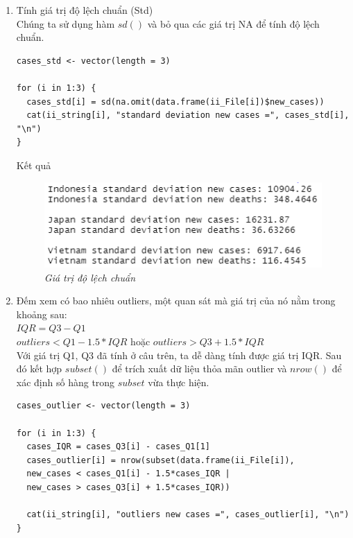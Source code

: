 \documentclass[a4paper]{article}
\theoremstyle{definition}
\begin{document}
\begin{enumerate}[1)]
    
\item Tính giá trị độ lệch chuẩn (Std)\\
    Chúng ta sử dụng hàm $sd()$ và bỏ qua các giá trị NA để tính độ lệch chuẩn.
    
    \begin{lstlisting}
cases_std <- vector(length = 3)

for (i in 1:3) {
  cases_std[i] = sd(na.omit(data.frame(ii_File[i])$new_cases))
  cat(ii_string[i], "standard deviation new cases =", cases_std[i], "\n")
}
    \end{lstlisting}
    
        Kết quả
    \begin{figure}[H]
        \begin{center}
            \includegraphics[scale=0.7]{ii/sd.png}
        \end{center}
        \vspace{+3mm}\caption{\it Giá trị độ lệch chuẩn}
    \end{figure}


\item Đếm xem có bao nhiêu outliers, một quan sát mà giá trị của nó nằm trong khoảng sau:\\
$IQR = Q3 - Q1$\\
$outliers < Q1 - 1.5*IQR$ hoặc $outliers > Q3 + 1.5*IQR$\\
    Với giá trị Q1, Q3 đã tính ở câu trên, ta dễ dàng tính được giá trị IQR. Sau đó kết hợp $subset()$ để trích xuất dữ liệu thỏa mãn outlier và $nrow()$ để xác định số hàng trong $subset$ vừa thực hiện.
    
    \begin{lstlisting}
cases_outlier <- vector(length = 3)

for (i in 1:3) {
  cases_IQR = cases_Q3[i] - cases_Q1[1] 
  cases_outlier[i] = nrow(subset(data.frame(ii_File[i]), 
  new_cases < cases_Q1[i] - 1.5*cases_IQR | 
  new_cases > cases_Q3[i] + 1.5*cases_IQR))
  
  cat(ii_string[i], "outliers new cases =", cases_outlier[i], "\n")
}
    \end{lstlisting}
    

\end{enumerate}
\end{document}
